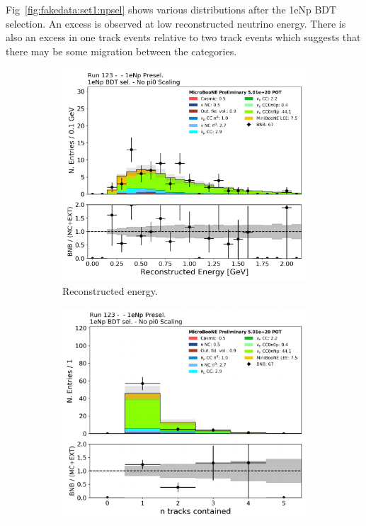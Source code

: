 Fig~\ref{fig:fakedata:set1:npsel} shows various distributions after the 1eNp BDT selection.  An excess is observed at low reconstructed neutrino energy. There is also an excess in one track events relative to two track events which suggests that there may be some migration between the categories.

\begin{figure}[H] 
\begin{center}
    \begin{subfigure}[b]{0.45\textwidth}
    \centering
    \includegraphics[width=1.00\textwidth]{Fakedata/set1/Np_postsel_recoe.pdf}
    \caption{\label{fig:fakedata:set1:Np_postsel_recoe} Reconstructed energy.}
    \end{subfigure}
    \begin{subfigure}[b]{0.45\textwidth}
    \centering
    \includegraphics[width=1.00\textwidth]{Fakedata/set1/Np_postsel_ntracks.pdf}

\end{subfigure}
\end{center}
\end{figure}
